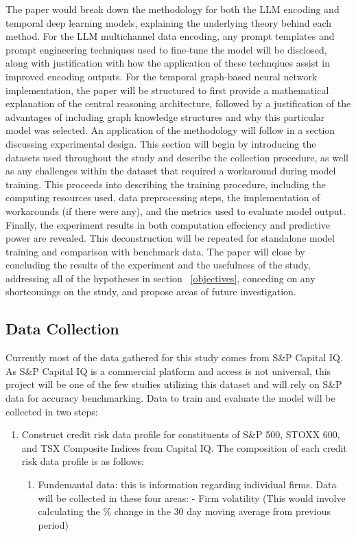 \documentclass[10pt]{article}
\begin{document}
\begin{multicols*}{2}
The paper would break down the methodology for both the LLM encoding and temporal deep learning models, explaining the underlying theory behind each method. For the LLM multichannel data encoding, any prompt templates and prompt engineering techniques used to fine-tune the model will be disclosed, along with justification with how the application of these technqiues assist in improved encoding outputs. For the temporal graph-based neural network implementation, the paper will be structured to first provide a mathematical explanation of the central reasoning architecture, followed by a justification of the advantages of including graph knowledge structures and why this particular model was selected.
An application of the methodology will follow in a section discussing experimental design. This section will begin by introducing the datasets used throughout the study and describe the collection procedure, as well as any challenges within the dataset that required a workaround during model training. This proceeds into describing the training procedure, including the computing resources used, data preprocessing steps, the implementation of workarounds (if there were any), and the metrics used to evaluate model output. Finally, the experiment results in both computation effeciency and predictive power are revealed. This deconstruction will be repeated for standalone model training and comparison with benchmark data.
The paper will close by concluding the results of the experiment and the usefulness of the study, addressing all of the hypotheses in section ~\ref{objectives}, conceding on any shortcomings on the study, and propose areas of future investigation.

\subsection{Data Collection}\label{data}

Currently most of the data gathered for this study comes from S\&P Capital IQ. As S\&P Capital IQ is a commercial platform and access is not universal, this project will be one of the few studies utilizing this dataset and will rely on S\&P data for accuracy benchmarking. 
Data to train and evaluate the model will be collected in two steps:
\begin{enumerate}
	\item Construct credit risk data profile for constituents of S\&P 500, STOXX 600, and TSX Composite Indices from Capital IQ. 
	The composition of each credit risk data profile is as follows:
	\begin{enumerate}
		\item Fundemantal data: this is information regarding individual firms. Data will be collected in these four areas:
			- Firm volatility (This would involve calculating the \% change in the 30 day moving average from previous period)


\end{enumerate}
\end{enumerate}
\end{multicols*}
\end{document}
